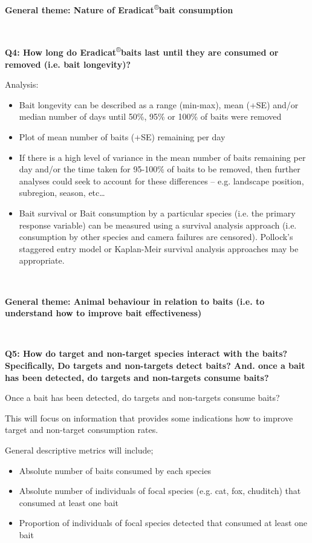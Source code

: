 \documentclass[version=last,
    paper=a4,                               %
    10pt,                                   %
    dvipsnames,
    oneside,                              %
    headings=openany,                       %
    open=any,
    BCOR=7mm,                               %
    DIV=15,     %
]{scrbook}
\begin{document}
\textbf{~}

\textbf{General theme: Nature of
Eradicat}\textsuperscript{®}\textbf{bait consumption}

\textbf{~}

\textbf{Q4: How long do Eradicat}\textsuperscript{®}\textbf{baits last
until they are consumed or removed (i.e. bait longevity)?}

Analysis:

\begin{itemize}
\itemsep1pt\parskip0pt
\item
  Bait longevity can be described as a range (min-max), mean (+SE)
  and/or median number of days until 50\%, 95\% or 100\% of baits were
  removed
\item
  Plot of mean number of baits (+SE) remaining per day
\item
  If there is a high level of variance in the mean number of baits
  remaining per day and/or the time taken for 95-100\% of baits to be
  removed, then further analyses could seek to account for these
  differences -- e.g. landscape position, subregion, season, etc\ldots{}
\item
  Bait survival or Bait consumption by a particular species (i.e. the
  primary response variable) can be measured using a survival analysis
  approach (i.e. consumption by other species and camera failures are
  censored). Pollock's staggered entry model or Kaplan-Meir survival
  analysis approaches may be appropriate.
\end{itemize}

~

\textbf{General theme: Animal behaviour in relation to baits (i.e. to
understand how to improve bait effectiveness)}

\textbf{~}

\textbf{Q5: How do target and non-target species interact with the
baits? Specifically, Do targets and non-targets detect baits? And. once
a bait has been detected, do targets and non-targets consume baits?}

Once a bait has been detected, do targets and non-targets consume baits?

This will focus on information that provides some indications how to
improve target and non-target consumption rates.

General descriptive metrics will include;

\begin{itemize}
\itemsep1pt\parskip0pt
\item
  Absolute number of baits consumed by each species
\item
  Absolute number of individuals of focal species (e.g. cat, fox,
  chuditch) that consumed at least one bait
\item
  Proportion of individuals of focal species detected that consumed at
  least one bait
\end{itemize}
\end{document}
